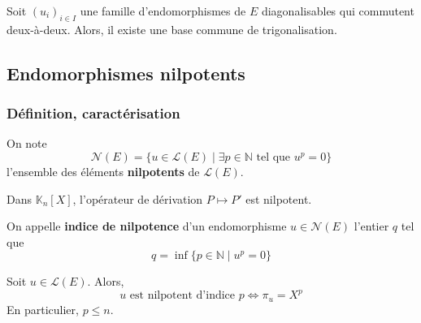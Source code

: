 
  \begin{theorem}
    Soit $(u_i)_{i \in I}$ une famille d'endomorphismes de $E$ diagonalisables qui commutent deux-à-deux. Alors, il existe une base commune de trigonalisation.
  \end{theorem}

  \subsection{Endomorphismes nilpotents}

  \subsubsection{Définition, caractérisation}


  \begin{definition}
    On note
    \[ \mathcal{N}(E) = \{ u \in \mathcal{L}(E) \mid \exists p \in \mathbb{N} \text{ tel que } u^p = 0 \} \]
    l'ensemble des éléments \textbf{nilpotents} de $\mathcal{L}(E)$.
  \end{definition}

  \begin{example}
    Dans $\mathbb{K}_n[X]$, l'opérateur de dérivation $P \mapsto P'$ est nilpotent.
  \end{example}

  \begin{definition}
    On appelle \textbf{indice de nilpotence} d'un endomorphisme $u \in \mathcal{N}(E)$ l'entier $q$ tel que
    \[ q = \inf \{ p \in \mathbb{N} \mid u^p = 0 \} \]
  \end{definition}

  \begin{proposition}
    Soit $u \in \mathcal{L}(E)$. Alors,
    \[ u \text{ est nilpotent d'indice } p \iff \pi_u = X^p \]
    En particulier, $p \leq n$.
  \end{proposition}

